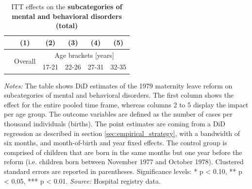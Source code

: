 \documentclass[11pt, a4paper]{article} %
\begin{document}
\newpage
{} 
\vspace*{\fill}
\begin{table}[H] \centering 
	\begin{threeparttable} \centering \caption{ITT effects on the \textbf{subcategories of mental and behavioral disorders (total)}}\label{tab: ITT_across_d5subcategories_per_age_group_total}
		{\def\sym#1{\ifmmode^{#1}\else\(^{#1}\)\fi} 
			\begin{tabular}{l*{5}{c}}
				\toprule 
				&\multicolumn{1}{c}{(1)}&\multicolumn{1}{c}{(2)}&\multicolumn{1}{c}{(3)}&\multicolumn{1}{c}{(4)}&\multicolumn{1}{c}{(5)}\\
				\midrule
				&\multirow{2}{*}{Overall} & \multicolumn{4}{c}{Age brackets [years]} \\ 
				\cmidrule(lr){3-6}
				&&\multicolumn{1}{c}{17-21}&\multicolumn{1}{c}{22-26}&\multicolumn{1}{c}{27-31}&\multicolumn{1}{c}{32-35}\\
				
				\midrule
				
				
				
				\bottomrule 
		\end{tabular}}
	\end{threeparttable} 
	\begin{minipage}{0.9\linewidth}
		\scriptsize \emph{Notes:} The table shows DiD estimates of the 1979 maternity leave reform on subcategories of mental and behavioral disorders. The first column shows the effect for the entire pooled time frame, whereas columns 2 to 5 display the impact per age group. The outcome variables are defined as the number of cases per thousand individuals (births). The point estimates are coming from a DiD regression as described in section \ref{sec:empirical_strategy}, with a bandwidth of six months, and month-of-birth and year fixed effects. The control group is comprised of children that are born in the same months but one year before the reform (i.e. children born between November 1977 and October 1978). Clustered standard errors are reported in parentheses. \newline Significance levels: * p < 0.10, ** p < 0.05, *** p < 0.01. \newline 	\emph{Source:} Hospital registry data.
	\end{minipage}
\end{table} 
\vspace*{\fill}\clearpage 
\restoregeometry
\newpage
{} 

\restoregeometry
\end{document}
